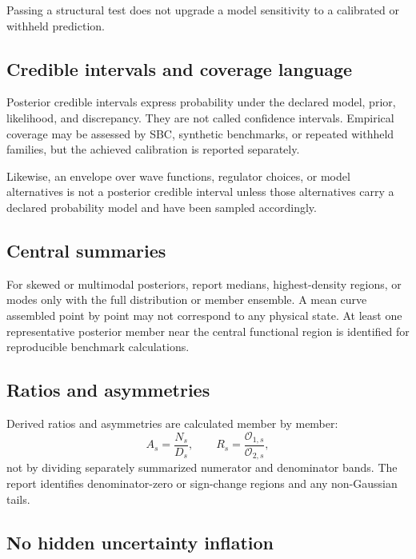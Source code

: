 \documentclass[11pt]{article}
\newcommand{\cO}{\mathcal O}
\begin{document}
Passing a structural test does not upgrade a model sensitivity to a calibrated
or withheld prediction.

\subsection{Credible intervals and coverage language}

Posterior credible intervals express probability under the declared model,
prior, likelihood, and discrepancy.  They are not called confidence intervals.
Empirical coverage may be assessed by SBC, synthetic benchmarks, or repeated
withheld families, but the achieved calibration is reported separately.

Likewise, an envelope over wave functions, regulator choices, or model
alternatives is not a posterior credible interval unless those alternatives
carry a declared probability model and have been sampled accordingly.

\subsection{Central summaries}

For skewed or multimodal posteriors, report medians, highest-density regions,
or modes only with the full distribution or member ensemble.  A mean curve
assembled point by point may not correspond to any physical state.  At least
one representative posterior member near the central functional region is
identified for reproducible benchmark calculations.

\subsection{Ratios and asymmetries}

Derived ratios and asymmetries are calculated member by member:
\begin{equation}
 A_s
 =
 \frac{N_s}{D_s},
 \qquad
 R_s
 =
 \frac{\cO_{1,s}}{\cO_{2,s}},
 \label{eq:memberwise-ratio}
\end{equation}
not by dividing separately summarized numerator and denominator bands.  The
report identifies denominator-zero or sign-change regions and any non-Gaussian
tails.

\subsection{No hidden uncertainty inflation}
\end{document}
